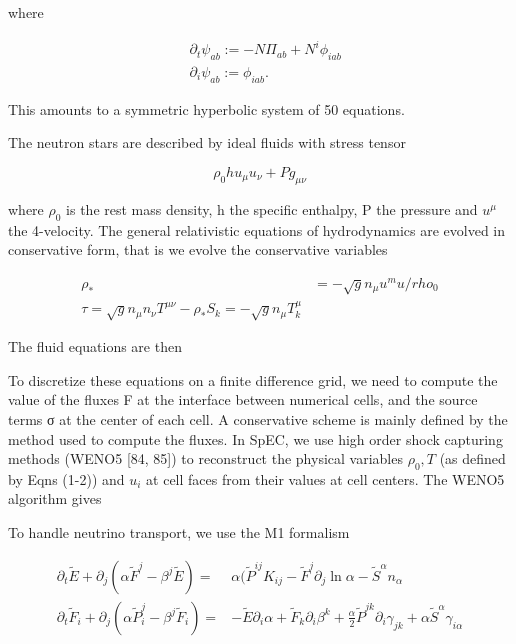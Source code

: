 \documentclass{ut-thesis}
\begin{document}
where

\begin{align}
  &\partial_t\psi_{ab} := - N\Pi_{ab} + N^i\phi_{iab} \\
  &\partial_i\psi_{ab} := \phi_{iab}.
\end{align}

This amounts to a symmetric hyperbolic system of 50 equations.

The neutron stars are described by ideal fluids with stress tensor

\begin{equation}
\rho_0 h u_\mu u_\nu + Pg_{\mu\nu}
\end{equation}

where $\rho_0$ is the rest mass density, h the specific enthalpy, P the pressure and $u^\mu$ the 4-velocity. The general relativistic equations of hydrodynamics are evolved in conservative form, that is we evolve the conservative variables

\begin{align}
  \rho_* &= -\sqrt{g}n_\mu u^mu /rho_0 \\
  \tau = \sqrt{g}n_\mu n_\nu T^{\mu\nu} - \rho_*
  S_k = -\sqrt{g}n_\mu T^\mu_k
\end{align}

The fluid equations are then




  
To discretize these equations on a finite difference grid, we need to compute the value of the fluxes F at the interface between numerical cells, and the source terms σ at the center of each cell. A conservative scheme is mainly defined by the method used to compute the fluxes. In SpEC, we use high order shock capturing methods (WENO5 [84, 85]) to reconstruct the physical variables $ρ_0,T$ (as defined by Eqns (1-2)) and $u_i$ at cell faces from their values at cell centers. The WENO5 algorithm gives

To handle neutrino transport, we use the M1 formalism

\begin{align}
  \partial_t \widetilde{E} + \partial_j(\alpha \widetilde{F}^j - \beta^j \widetilde{E}) =& \alpha(\widetilde{P}^{ij}K_{ij} - \widetilde{F}^j\partial_j\ln\alpha - \widetilde{S}^\alpha n_{\alpha} \\
  \partial_t \widetilde{F}_i + \partial_j(\alpha \widetilde{P}^j_i - \beta^j\widetilde{F}_i) =& -\widetilde{E}\partial_i\alpha + \widetilde{F}_k\partial_i\beta^k + \frac{\alpha}{2}\widetilde{P}^{jk}\partial_i\gamma_{jk} + \alpha\widetilde{S}^\alpha\gamma_{i\alpha} \\
\end{align}
\end{document}
